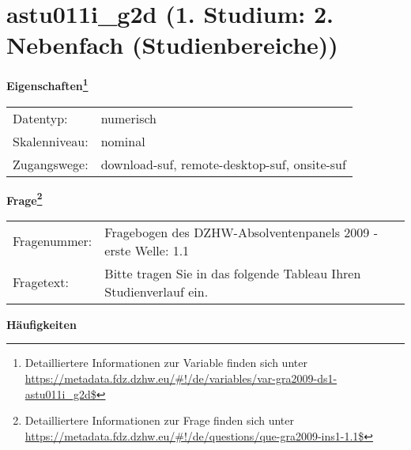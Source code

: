 
    \setcounter{footnote}{0}

    \vspace*{-1.8cm}
	\section{astu011i\_g2d (1. Studium: 2. Nebenfach (Studienbereiche))}
	\label{section:astu011i_g2d}



    \vspace*{0.5cm}
    \noindent\textbf{Eigenschaften\footnote{Detailliertere Informationen zur Variable finden sich unter
		\url{https://metadata.fdz.dzhw.eu/\#!/de/variables/var-gra2009-ds1-astu011i_g2d$}}}\\
	\begin{tabularx}{\hsize}{@{}lX}
	Datentyp: & numerisch \\
	Skalenniveau: & nominal \\
	Zugangswege: &
	  download-suf, 
	  remote-desktop-suf, 
	  onsite-suf
 \\
    \end{tabularx}



				\vspace*{0.5cm}
                \noindent\textbf{Frage\footnote{Detailliertere Informationen zur Frage finden sich unter
		              \url{https://metadata.fdz.dzhw.eu/\#!/de/questions/que-gra2009-ins1-1.1$}}}\\
				\begin{tabularx}{\hsize}{@{}lX}
					Fragenummer: &
					  Fragebogen des DZHW-Absolventenpanels 2009 - erste Welle:
					  1.1
 \\
					Fragetext: & Bitte tragen Sie in das folgende Tableau Ihren Studienverlauf ein. \\
				\end{tabularx}





        		\vspace*{0.5cm}
                \noindent\textbf{Häufigkeiten}

